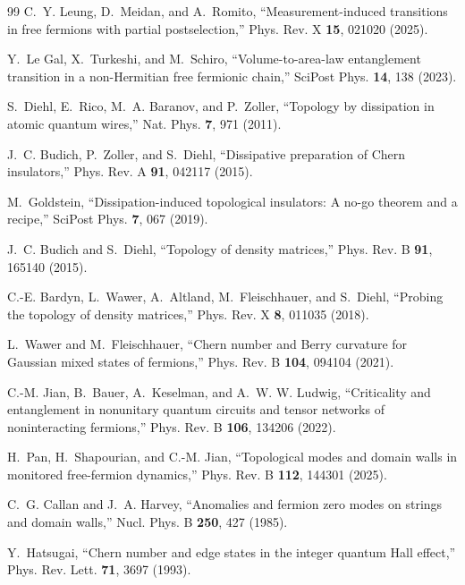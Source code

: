 \documentclass[aps,twocolumn,floatfix,superscriptaddress,nofootinbib]{revtex4-2}
\begin{document}
\begin{thebibliography}{99}
C.~Y. Leung, D.~Meidan, and A.~Romito,
``Measurement-induced transitions in free fermions with partial postselection,''
Phys. Rev. X \textbf{15}, 021020 (2025).

Y.~Le Gal, X.~Turkeshi, and M.~Schiro,
``Volume-to-area-law entanglement transition in a non-Hermitian free fermionic chain,''
SciPost Phys. \textbf{14}, 138 (2023).

S.~Diehl, E.~Rico, M.~A. Baranov, and P.~Zoller,
``Topology by dissipation in atomic quantum wires,''
Nat. Phys. \textbf{7}, 971 (2011).

J.~C. Budich, P.~Zoller, and S.~Diehl,
``Dissipative preparation of Chern insulators,''
Phys. Rev. A \textbf{91}, 042117 (2015).

M.~Goldstein,
``Dissipation-induced topological insulators: A no-go theorem and a recipe,''
SciPost Phys. \textbf{7}, 067 (2019).

J.~C. Budich and S.~Diehl,
``Topology of density matrices,''
Phys. Rev. B \textbf{91}, 165140 (2015).

C.-E. Bardyn, L.~Wawer, A.~Altland, M.~Fleischhauer, and S.~Diehl,
``Probing the topology of density matrices,''
Phys. Rev. X \textbf{8}, 011035 (2018).

L.~Wawer and M.~Fleischhauer,
``Chern number and Berry curvature for Gaussian mixed states of fermions,''
Phys. Rev. B \textbf{104}, 094104 (2021).

C.-M. Jian, B.~Bauer, A.~Keselman, and A.~W. W. Ludwig,
``Criticality and entanglement in nonunitary quantum circuits and tensor networks of noninteracting fermions,''
Phys. Rev. B \textbf{106}, 134206 (2022).

H.~Pan, H.~Shapourian, and C.-M. Jian,
``Topological modes and domain walls in monitored free-fermion dynamics,''
Phys. Rev. B \textbf{112}, 144301 (2025).

C.~G. Callan and J.~A. Harvey,
``Anomalies and fermion zero modes on strings and domain walls,''
Nucl. Phys. B \textbf{250}, 427 (1985).

Y.~Hatsugai,
``Chern number and edge states in the integer quantum Hall effect,''
Phys. Rev. Lett. \textbf{71}, 3697 (1993).


\end{thebibliography}
\end{document}
